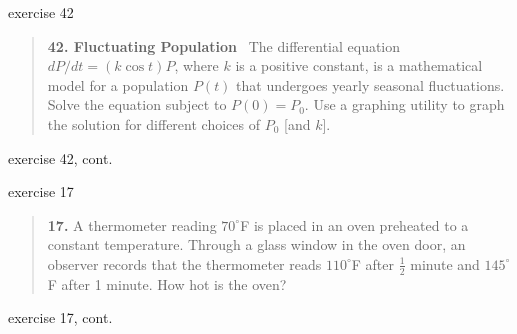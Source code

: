 \documentclass[colorlinks]{beamer}
\begin{document}
\begin{frame}{exercise 42}

\small
\begin{quotation}
\noindent \textbf{42.  Fluctuating Population} \, The differential equation $dP/dt = (k \cos t) P$, where $k$ is a positive constant, is a mathematical model for a population $P(t)$ that undergoes yearly seasonal fluctuations.  Solve the equation subject to $P(0)=P_0$.  Use a graphing utility to graph the solution for different choices of $P_0$ [and $k$]. 
\end{quotation}

\vspace{45mm}
\end{frame}


\begin{frame}{exercise 42, cont.}

\vspace{30mm}

\hfill %
\end{frame}


\begin{frame}{exercise 17}

\small
\begin{quotation}
\noindent \textbf{17.} A thermometer reading $70^\circ$F is placed in an oven preheated to a constant temperature.  Through a glass window in the oven door, an observer records that the thermometer reads $110^\circ$F after $\frac{1}{2}$ minute and $145^\circ$F after 1 minute.  How hot is the oven?
\end{quotation}

\vspace{50mm}
\end{frame}


\begin{frame}{exercise 17, cont.}

\vspace{20mm}

\hfill %
\end{frame}
\end{document}
